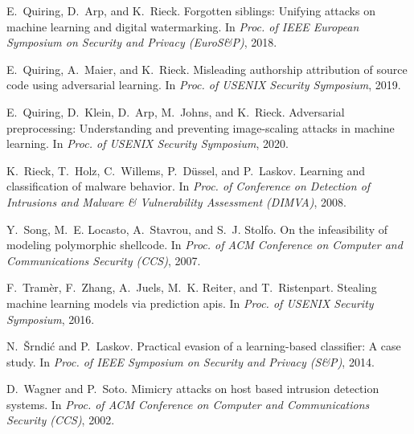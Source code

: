 \documentclass[conference]{IEEEtran}
\begin{document}
{\begin{thebibliography}{47}
	E.~Quiring, D.~Arp, and K.~Rieck.
	\newblock Forgotten siblings: {U}nifying attacks on machine 
	learning and
	digital watermarking.
	\newblock In \emph{Proc. of {IEEE} European Symposium on Security 
	and Privacy
		({EuroS\&P})}, 2018.
	
	E.~Quiring, A.~Maier, and K.~Rieck.
	\newblock Misleading authorship attribution of source code using 
	adversarial
	learning.
	\newblock In \emph{Proc. of {USENIX} Security Symposium}, 2019.
	
	E.~Quiring, D.~Klein, D.~Arp, M.~Johns, and K.~Rieck.
	\newblock Adversarial preprocessing: {U}nderstanding and preventing
	image-scaling attacks in machine learning.
	\newblock In \emph{Proc. of {USENIX} Security Symposium}, 2020.
	
	K.~Rieck, T.~Holz, C.~Willems, P.~Düssel, and P.~Laskov.
	\newblock Learning and classification of malware behavior.
	\newblock In \emph{Proc. of Conference on Detection of Intrusions 
	and Malware
		{\&} Vulnerability Assessment ({DIMVA})}, 2008.
	
	Y.~Song, M.~E. Locasto, A.~Stavrou, and S.~J. Stolfo.
	\newblock On the infeasibility of modeling polymorphic shellcode.
	\newblock In \emph{Proc. of {ACM} Conference on Computer and 
	Communications
		Security ({CCS})}, 2007.
	
	F.~Tram{\`e}r, F.~Zhang, A.~Juels, M.~K. Reiter, and T.~Ristenpart.
	\newblock Stealing machine learning models via prediction apis.
	\newblock In \emph{Proc. of {USENIX} Security Symposium}, 2016.
	
	N.~\v{S}rndi\'{c} and P.~Laskov.
	\newblock Practical evasion of a learning-based classifier: A case 
	study.
	\newblock In \emph{Proc. of {IEEE} Symposium on Security and 
	Privacy ({S\&P})},
	2014.
	
	D.~Wagner and P.~Soto.
	\newblock Mimicry attacks on host based intrusion detection systems.
	\newblock In \emph{Proc. of {ACM} Conference on Computer and 
	Communications
		Security ({CCS})}, 2002.
	

\end{thebibliography}}
\end{document}
